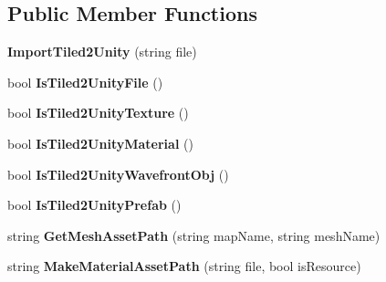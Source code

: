 \subsection*{Public Member Functions}
\begin{DoxyCompactItemize}
\item 
\mbox{\label{class_tiled2_unity_1_1_import_tiled2_unity_aa32997e829fe81a1a7b8b5ede4a12133}} 
{\bfseries Import\+Tiled2\+Unity} (string file)
\item 
\mbox{\label{class_tiled2_unity_1_1_import_tiled2_unity_ad87a2791643d8271785ca5088f51ff11}} 
bool {\bfseries Is\+Tiled2\+Unity\+File} ()
\item 
\mbox{\label{class_tiled2_unity_1_1_import_tiled2_unity_a00ff3f8735692125bfb3e2aa20c5a2b0}} 
bool {\bfseries Is\+Tiled2\+Unity\+Texture} ()
\item 
\mbox{\label{class_tiled2_unity_1_1_import_tiled2_unity_aeaaf1f5bf827d2368f7307f9a1ecd233}} 
bool {\bfseries Is\+Tiled2\+Unity\+Material} ()
\item 
\mbox{\label{class_tiled2_unity_1_1_import_tiled2_unity_a9a7be37df827bb2135724cdb781282c0}} 
bool {\bfseries Is\+Tiled2\+Unity\+Wavefront\+Obj} ()
\item 
\mbox{\label{class_tiled2_unity_1_1_import_tiled2_unity_acb38dc0527118d7b589d7e193feafe61}} 
bool {\bfseries Is\+Tiled2\+Unity\+Prefab} ()
\item 
\mbox{\label{class_tiled2_unity_1_1_import_tiled2_unity_a66db37d79d3768748059338f5281a4fa}} 
string {\bfseries Get\+Mesh\+Asset\+Path} (string map\+Name, string mesh\+Name)
\item 
\mbox{\label{class_tiled2_unity_1_1_import_tiled2_unity_a8eccce3bc913c345c5bec35c38daa2c1}} 
string {\bfseries Make\+Material\+Asset\+Path} (string file, bool is\+Resource)
\item 
\mbox{\label{class_tiled2_unity_1_1_import_tiled2_unity_a36d076495b6d091959683c301a04b4b2}} 

\end{DoxyCompactItemize}
